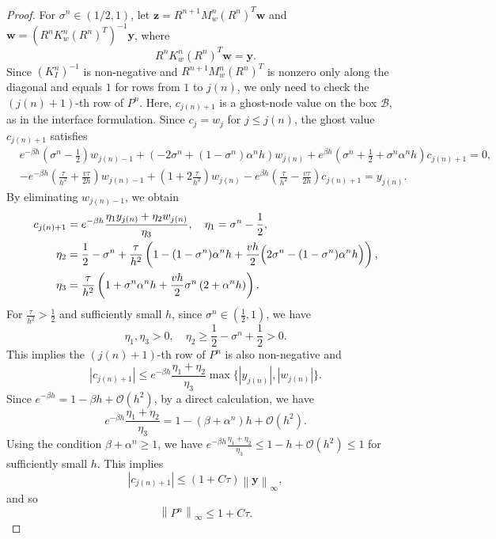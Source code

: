\documentclass[11pt,reqno]{amsart}
\theoremstyle{plain}
\theoremstyle{definition}
\numberwithin{equation}{section}
\newcommand{\paren}[1]{\left(#1\right)}
\newcommand{\mc}[1]{\mathcal{#1}}
\newcommand{\bm}[1]{\boldsymbol{#1}}
\newcommand{\abs}[1]{\left\lvert #1 \right\rvert}
\newcommand{\norm}[1]{\left\lVert #1 \right\rVert}
\begin{document}
\begin{proof}
For $\sigma^n \in (1/2,1)$, let
$\bm z=R^{n+1}M_w^n(R^n)^T\bm w$ and
$\bm w=(R^nK_w^n(R^n)^T)^{-1}\bm y$, where
\begin{equation}
    R^n K_w^n (R^n)^T \bm w = \bm y.
\end{equation}
Since $(K_I^n)^{-1}$ is non-negative and $R^{n+1} M_w^{n} (R^{n})^T$ is nonzero only along the diagonal and equals $1$ for rows from $1$ to $j(n)$, we only need to check the $(j(n)+1)$-th row of $P^n$. Here, $c_{j(n)+1}$ is a ghost-node value on the box $\mc B$, as in the interface formulation.
Since $c_j = w_j$ for $j \le j(n)$, the ghost value $c_{j(n)+1}$ satisfies
\begin{align}
    &e^{-\beta h}\paren{\sigma^n-\frac{1}{2}} w_{j(n)-1} + \paren{-2\sigma^n + \paren{1-\sigma^n}\alpha^n h}w_{j(n)} +e^{\beta h} \paren{\sigma^n + \frac{1}{2} + \sigma^n \alpha^n h} c_{j(n)+1} = 0,\\
    &- e^{-\beta h}\paren{\frac{\tau}{h^2}+\frac{v\tau}{2h}}w_{j(n)-1} + \paren{1+2\frac{\tau}{h^2}} w_{j(n)}  - e^{\beta h} \paren{\frac{\tau}{h^2} - \frac{v\tau}{2h}} c_{j(n)+1} = y_{j(n)}.
\end{align}
By eliminating $w_{j(n)-1}$, we obtain
\begin{align}
c_{j(n)+1} &= e^{-\beta h} \frac{\eta_1 y_{j(n)} + \eta_2 w_{j(n)}}{\eta_3}, \quad \eta_1 = \sigma^n-\frac{1}{2}, \\
    \eta_2 &= \frac{1}{2}-\sigma^n + \frac{\tau}{h^2} \paren{ 1-(1-\sigma^n)\alpha^nh+\frac{vh}{2}\Bigl(2\sigma^n-(1-\sigma^n)\alpha^nh\Bigr)},  \\
    \eta_3 &= \frac{\tau}{h^2}\paren{ 1+\sigma^n\alpha^nh + \frac{vh}{2} \sigma^n \paren{2+\alpha^nh}}.
\end{align}
For $\frac{\tau}{h^2}>\frac{1}{2}$ and sufficiently small $h$, since $\sigma^n\in (\frac{1}{2},1)$, we have
\begin{equation}
    \eta_1, \eta_3 > 0,\quad \eta_2 \ge \frac{1}{2}-\sigma^n + \frac{1}{2}>0.
\end{equation}
This implies the $(j(n)+1)$-th row of $P^n$ is also non-negative and
\begin{equation}
    \abs{c_{j(n)+1}} \le e^{-\beta h}\frac{\eta_1+\eta_2}{\eta_3}\max\{\abs{y_{j(n)}}, \abs{w_{j(n)}}\}.
\end{equation}
Since $e^{-\beta h} = 1 - \beta h + \mc O(h^2)$, by a direct calculation, we have
\begin{equation}
    e^{-\beta h} \frac{\eta_1+\eta_2}{\eta_3} = 1 - (\beta+\alpha^n)h + \mc O(h^2).
\end{equation}
Using the condition $\beta + \alpha^n \ge 1$, we have $e^{-\beta h} \frac{\eta_1+\eta_2}{\eta_3} \le 1 - h + \mc O(h^2) \le 1$ for sufficiently small $h$. This implies
\begin{equation}
    \abs{c_{j(n)+1}} \le \paren{1+C\tau}\norm{\bm y}_\infty,
\end{equation}
and so
\begin{equation}
    \norm{P^n}_\infty \le 1+C\tau.
\end{equation}
\end{proof}
\end{document}
